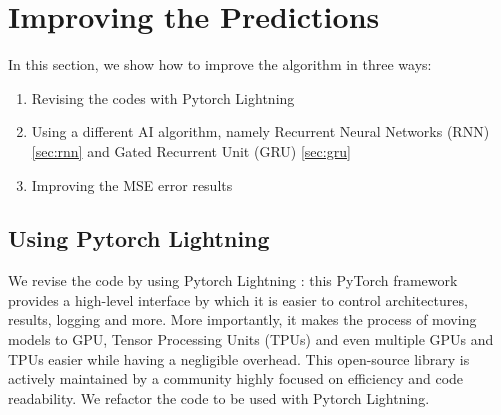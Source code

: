 \documentclass[12pt]{article}
\begin{document}
\section{Improving the Predictions}
In this section, we show how to improve the algorithm in three ways:
\begin{enumerate}
    \item Revising the codes with Pytorch Lightning
    \item Using a different AI algorithm, namely Recurrent Neural Networks (RNN) \ref{sec:rnn} and Gated Recurrent Unit (GRU) \ref{sec:gru}
    \item Improving the MSE error results
\end{enumerate}

\subsection{Using Pytorch Lightning}
We revise the code by using Pytorch Lightning \cite{falcon2019pytorch}: this PyTorch framework provides a high-level interface by which it is easier to control architectures, results, logging and more. 
More importantly, it makes the process of moving models to GPU, Tensor Processing Units (TPUs) and even multiple GPUs and TPUs easier while having a negligible overhead. This open-source library is actively maintained by a community highly focused on efficiency and code readability. We refactor the code to be used with Pytorch Lightning.
\end{document}
